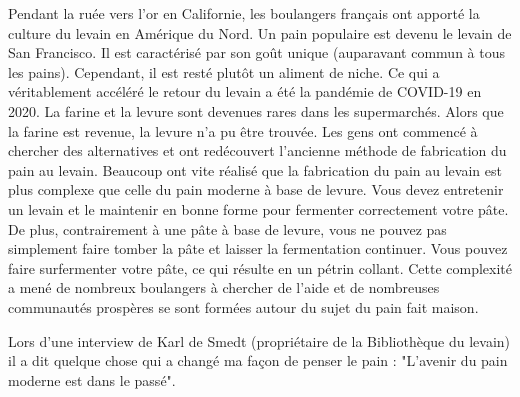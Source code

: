 Pendant la ruée vers l'or en Californie, les boulangers français ont apporté la culture du levain en Amérique du Nord. Un pain populaire est devenu le levain de San Francisco. Il est caractérisé par son goût unique (auparavant commun à tous les pains). Cependant, il est resté plutôt un aliment de niche. Ce qui a véritablement accéléré le retour du levain a été la pandémie de COVID-19 en 2020. La farine et la levure sont devenues rares dans les supermarchés. Alors que la farine est revenue, la levure n'a pu être trouvée. Les gens ont commencé à chercher des alternatives et ont redécouvert l'ancienne méthode de fabrication du pain au levain. Beaucoup ont vite réalisé que la fabrication du pain au levain est plus complexe que celle du pain moderne à base de levure. Vous devez entretenir un levain et le maintenir en bonne forme pour fermenter correctement votre pâte. De plus, contrairement à une pâte à base de levure, vous ne pouvez pas simplement faire tomber la pâte et laisser la fermentation continuer. Vous pouvez faire surfermenter votre pâte, ce qui résulte en un pétrin collant. Cette complexité a mené de nombreux boulangers à chercher de l'aide et de nombreuses communautés prospères se sont formées autour du sujet du pain fait maison.

Lors d'une interview de Karl de Smedt (propriétaire de la Bibliothèque du levain) il a dit quelque chose qui a changé ma façon de penser le pain : "L'avenir du pain moderne est dans le passé".